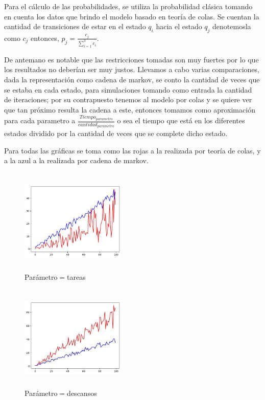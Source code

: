 \documentclass[10pt,a4paper,twocolumn]{article}
\begin{document}
Para el c\'alculo de las probabilidades, se utiliza la probabilidad cl\'asica tomando en cuenta los datos que brindo el modelo basado en teor\'ia de colas. Se cuentan la cantidad de transiciones de estar en el estado $q_i$ hacia el estado $q_j$ denotemosla como $c_j$ entonces, $p_j = \frac{c_j}{\sum_{i=1}^{3} c_i}$.

De antemano es notable que las restricciones tomadas son muy fuertes por lo que los resultados no deber\'ian ser muy justos. Llevamos a cabo varias comparaciones, dada la representaci\'on como cadena de markov, se conto la cantidad de veces que se estaba en cada estado, para simulaciones tomando como entrada la cantidad de iteraciones; por su contrapuesto tenemos al modelo por colas y se quiere ver que tan pr\'oximo resulta la cadena a este, entonces tomamos como aproximaci\'on para cada parametro a $\frac{Tiempo_{parametro}}{cantidad_{parametro}}$ o sea el tiempo que est\'a en los diferentes estados dividido por la cantidad de veces que se complete dicho estado.

Para todas las gr\'aficas se toma como las rojas a la realizada por teor\'ia
de colas, y a la azul a la realizada por cadena de markov.

\begin{figure}[H] %
    \centering %
    \includegraphics[width=5cm, height=5cm]{comparacion1.jpg} %
    \caption{Par\'ametro$ = $tareas} %
    \label{fig:mi_imagen1} %
\end{figure}

\begin{figure}[H] %
    \centering 
    \includegraphics[width=5cm, height=5cm]{comparacion2.jpg} 
    \caption{Par\'ametro$ = $descansos} 
    \label{fig:mi_imagen2} 
\end{figure}
\end{document}
